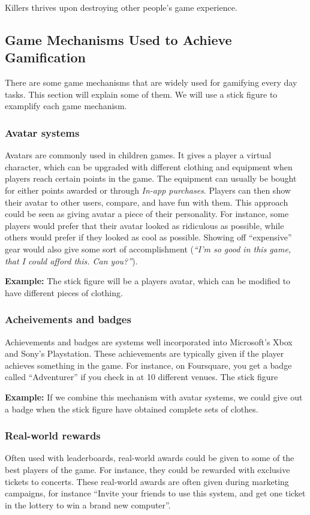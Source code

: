 Killers thrives upon destroying other people's game experience. 

\subsection{Game Mechanisms Used to Achieve Gamification} 

There are some game mechanisms that are widely used for gamifying every day tasks. This section will explain some of them. We will use a stick figure to examplify each game mechanism. 

\subsubsection{Avatar systems}
Avatars are commonly used in children games. It gives a player a virtual character, which can be upgraded with different clothing and equipment when players reach certain points in the game. The equipment can usually be bought for either points awarded or through \emph{In-app purchases}. Players can then show their avatar to other users, compare, and have fun with them. This approach could be seen as giving avatar a piece of their personality. For instance, some players would prefer that their avatar looked as ridiculous as possible, while others would prefer if they looked as cool as possible. Showing off ``expensive'' gear would also give some sort of accomplishment (\emph{``I'm so good in this game, that I could afford this. Can you?''}). 

\textbf{Example:} The stick figure will be a players avatar, which can be modified to have different pieces of clothing.  

\subsubsection{Acheivements and badges}
Achievements and badges are systems well incorporated into Microsoft's Xbox and Sony's Playstation. These achievements are typically given if the player achieves something in the game. For instance, on Foursquare, you get a badge called ``Adventurer'' if you check in at 10 different venues. The stick figure

\textbf{Example:} If we combine this mechanism with avatar systems, we could give out a badge when the stick figure have obtained complete sets of clothes.   

\subsubsection{Real-world rewards}
Often used with leaderboards, real-world awards could be given to some of the best players of the game. For instance, they could be rewarded with exclusive tickets to concerts. These real-world awards are often given during marketing campaigns, for instance ``Invite your friends to use this system, and get one ticket in the lottery to win a brand new computer''.  

